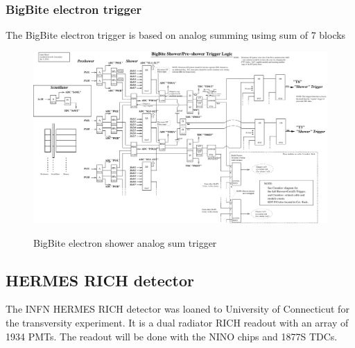 \documentclass{article}
\begin{document}
\subsubsection{BigBite electron trigger}
The BigBite electron trigger is based on analog summing usimg sum of 7 blocks
\newpage
\begin{figure}
\includegraphics[scale=0.9,angle=270]{figs/Sh-PS_logic_v2A.pdf}\\
\caption {BigBite electron shower analog sum trigger \label{BBEtrig}}
\end{figure}
\newpage
\subsection{HERMES RICH detector}
The INFN HERMES RICH detector was loaned to University of Connecticut for
the transversity experiment. It is a dual radiator RICH
readout with an array of 1934 PMTs. The readout will be done with the NINO chips and 1877S TDCs. 
\end{document}
